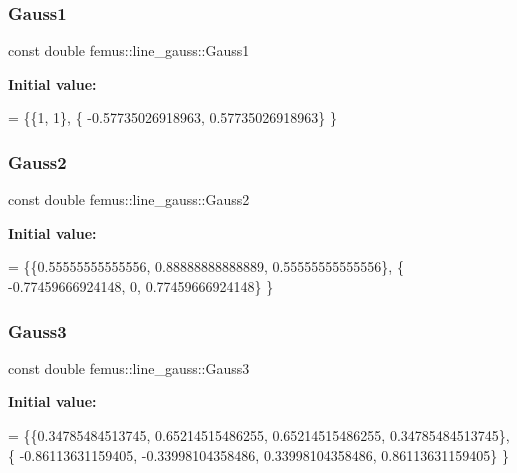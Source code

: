 \subsubsection{\texorpdfstring{Gauss1}{Gauss1}}
{\footnotesize\ttfamily const double femus\+::line\+\_\+gauss\+::\+Gauss1\hspace{0.3cm}{\ttfamily [static]}}

{\bfseries Initial value\+:}
\begin{DoxyCode}
= \{\{1, 1\},
    \{ -0.57735026918963, 0.57735026918963\}
  \}
\end{DoxyCode}
\mbox{\label{classfemus_1_1line__gauss_a06822a846f9c487eac127761930838b9}} 
\subsubsection{\texorpdfstring{Gauss2}{Gauss2}}
{\footnotesize\ttfamily const double femus\+::line\+\_\+gauss\+::\+Gauss2\hspace{0.3cm}{\ttfamily [static]}}

{\bfseries Initial value\+:}
\begin{DoxyCode}
= \{\{0.55555555555556, 0.88888888888889, 0.55555555555556\},
    \{ -0.77459666924148, 0, 0.77459666924148\}
  \}
\end{DoxyCode}
\mbox{\label{classfemus_1_1line__gauss_a3e4469455ddc119739471ab651b7dbff}} 
\subsubsection{\texorpdfstring{Gauss3}{Gauss3}}
{\footnotesize\ttfamily const double femus\+::line\+\_\+gauss\+::\+Gauss3\hspace{0.3cm}{\ttfamily [static]}}

{\bfseries Initial value\+:}
\begin{DoxyCode}
= \{\{0.34785484513745, 0.65214515486255, 0.65214515486255, 0.34785484513745\},
    \{ -0.86113631159405, -0.33998104358486, 0.33998104358486, 0.86113631159405\}
  \}
\end{DoxyCode}
\mbox{\label{classfemus_1_1line__gauss_ab2d03415a4eca319a16adfb8edb54074}} 
